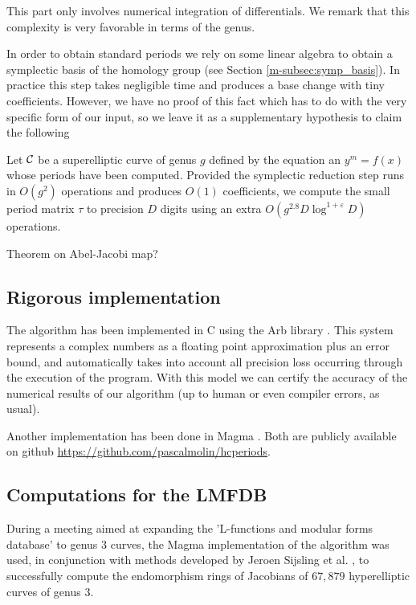 \documentclass[main.tex]{subfiles}
\begin{document}
  This part only involves numerical integration of differentials. We remark
  that this complexity is very favorable in terms of the genus.

  In order
  to obtain standard periods we rely on some linear algebra to obtain a
  symplectic basis of the homology group (see Section \ref{m-subsec:symp_basis}).
  In practice this step takes negligible time
  and produces a base change with tiny coefficients. However, we have no proof
  of this fact which has to do with the very specific form of our input,
  so we leave it as a supplementary hypothesis to claim the
  following
  \begin{thm}
     Let $\mathcal{C}$ be a superelliptic curve of genus $g$ defined by the equation an $y^m=f(x)$ whose periods
      have been computed.
      Provided the symplectic reduction
      step runs in $O(g^2)$ operations and produces $O(1)$ coefficients,
      we compute the small period matrix $τ$ to precision $D$
      digits using an extra $O(g^{2.8}D\log^{1+\varepsilon}D)$ operations.
  \end{thm}

  \todo Theorem on Abel-Jacobi map?
  
  
  \subsection{Rigorous implementation}

  The algorithm has been implemented in C using the Arb library \cite{Johansson2013arb}.
  This system represents a complex numbers as a floating point approximation
  plus an error bound, and automatically
  takes into account all precision loss occurring through the
  execution of the program. With this model we can certify
  the accuracy of the numerical results of our algorithm (up to human or even
  compiler errors, as usual).

  Another implementation has been done in Magma \cite{Magma}. Both are publicly available
  on github \url{https://github.com/pascalmolin/hcperiods}.

  
  \subsection{Computations for the LMFDB}
    
    During a meeting aimed at expanding the 'L-functions and modular forms database' \cite[LMFDB]{lmfdb} to genus $3$ curves, 
  the Magma implementation of the algorithm was used, in conjunction with methods developed by Jeroen Sijsling et al. \cite{CMSVEndos}, to successfully compute
  the endomorphism rings of Jacobians of $67,879$ hyperelliptic curves of genus $3$.
  
\end{document}
